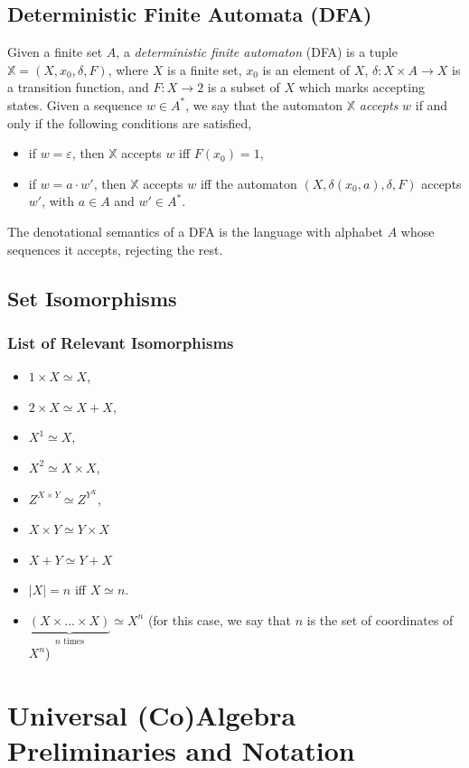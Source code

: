 \subsection{Deterministic Finite Automata (DFA)}
Given a finite set $A$, a \emph{deterministic finite automaton} (DFA) is a tuple $\mathbb{X}=(X,x_0,\delta,F)$, where $X$ is a finite set, $x_0$ is an element of $X$, $\delta\colon X\times A \rightarrow X$ is a transition function, and $F\colon X\rightarrow 2$ is a subset of $X$ which marks accepting states. Given a sequence $w\in A^*$, we say that the automaton $\mathbb{X}$ \emph{accepts} $w$ if and only if the following conditions are satisfied,
\begin{itemize}
    \item if $w=\varepsilon$, then $\mathbb{X}$ accepts $w$ iff $F(x_0)=1$, 
    \item if $w=a\cdot w'$, then $\mathbb{X}$ accepts $w$ iff the automaton $(X,\delta(x_0,a),\delta,F)$ accepts $w'$, with $a\in A$ and $w'\in A^*$.
\end{itemize}
The denotational semantics of a DFA is the language with alphabet $A$ whose sequences it accepts, rejecting the rest.

\subsection{Set Isomorphisms}
\subsubsection{List of Relevant Isomorphisms}
\begin{itemize}
    \item $1\times X \simeq X$,
    \item $2\times X\simeq X+X$,
    \item $X^1\simeq X$,
    \item $X^2\simeq X\times X$,
    \item $Z^{X\times Y}\simeq Z^{Y^X}$,
    \item $X\times Y \simeq Y\times X$
    \item $X + Y \simeq Y+ X$
    \item $|X|=n$ iff $X\simeq n$.
    \item $\underbrace{\left(X\times\ldots\times X\right)}_\text{$n$ times}\simeq X^n$ (for this case, we say that $n$ is the set of coordinates of $X^n$)
\end{itemize}
\section{Universal (Co)Algebra Preliminaries and Notation}
\label{sec:Preliminaries:Coalgebras}
